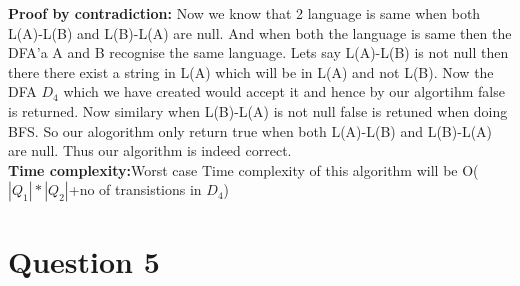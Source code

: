 \documentclass{article}
\begin{document}
\textbf{Proof by contradiction:}
Now we know that 2 language is same when both L(A)-L(B) and L(B)-L(A) are null. And when both the language is same then the DFA'a A and B recognise the same language.
Lets say L(A)-L(B) is not null then there there exist a string in L(A) which will be in L(A) and not L(B).
Now the DFA $D_4$ which we have created would accept it and hence by our algortihm false is returned. Now similary when L(B)-L(A) is not null false is retuned when doing BFS.
So our alogorithm only return true when both L(A)-L(B) and L(B)-L(A) are null. Thus our algorithm is indeed correct.\\
\textbf{Time complexity:}Worst case Time complexity of this algorithm will be O(${|Q_1|*|Q_2|}$+no of transistions in $D_4$)


\pagebreak
\section{Question 5}
\end{document}
